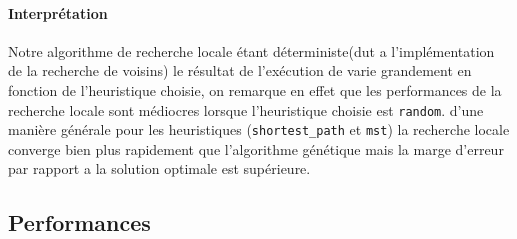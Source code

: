 \documentclass[10pt]{article}
\begin{document}
\paragraph{Interprétation} 
Notre algorithme de recherche locale étant déterministe(dut a l'implémentation de la recherche de voisins) le résultat de l'exécution de varie grandement en fonction de l'heuristique choisie, on remarque en effet que les performances de la recherche locale sont médiocres lorsque l'heuristique choisie est \texttt{random}. d'une manière générale pour les heuristiques (\texttt{shortest\_path} et \texttt{mst}) la recherche locale converge bien plus rapidement que l'algorithme génétique mais la marge d'erreur par rapport a la solution optimale est supérieure.

    
\subsection{Performances}
\end{document}
